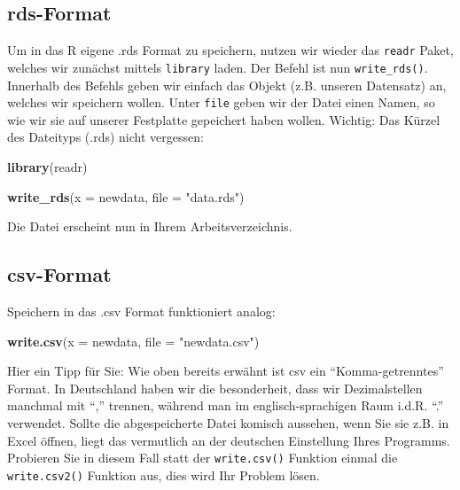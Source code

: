 \documentclass[
]{book}
\newenvironment{Shaded}{\begin{snugshade}}{\end{snugshade}}
\newcommand{\AttributeTok}[1]{\textcolor[rgb]{0.13,0.29,0.53}{#1}}
\newcommand{\FunctionTok}[1]{\textcolor[rgb]{0.13,0.29,0.53}{\textbf{#1}}}
\newcommand{\NormalTok}[1]{#1}
\newcommand{\StringTok}[1]{\textcolor[rgb]{0.31,0.60,0.02}{#1}}
\begin{document}
\subsection{rds-Format}\label{rds-format-1}

Um in das R eigene .rds Format zu speichern, nutzen wir wieder das \texttt{readr} Paket, welches wir zunächst mittels \texttt{library} laden. Der Befehl ist nun \texttt{write\_rds()}. Innerhalb des Befehls geben wir einfach das Objekt (z.B. unseren Datensatz) an, welches wir speichern wollen. Unter \texttt{file} geben wir der Datei einen Namen, so wie wir sie auf unserer Festplatte gepeichert haben wollen. Wichtig: Das Kürzel des Dateityps (.rds) nicht vergessen:

\begin{Shaded}
\begin{Highlighting}[]
\FunctionTok{library}\NormalTok{(readr)}

\FunctionTok{write\_rds}\NormalTok{(}\AttributeTok{x =}\NormalTok{ newdata, }\AttributeTok{file =} \StringTok{"data.rds"}\NormalTok{)}
\end{Highlighting}
\end{Shaded}

Die Datei erscheint nun in Ihrem Arbeitsverzeichnis.

\subsection{csv-Format}\label{csv-format-1}

Speichern in das .csv Format funktioniert analog:

\begin{Shaded}
\begin{Highlighting}[]
\FunctionTok{write.csv}\NormalTok{(}\AttributeTok{x =}\NormalTok{ newdata, }\AttributeTok{file =} \StringTok{"newdata.csv"}\NormalTok{)}
\end{Highlighting}
\end{Shaded}

Hier ein Tipp für Sie: Wie oben bereits erwähnt ist csv ein ``Komma-getrenntes'' Format. In Deutschland haben wir die besonderheit, dass wir Dezimalstellen manchmal mit ``,'' trennen, während man im englisch-sprachigen Raum i.d.R. ``.'' verwendet. Sollte die abgespeicherte Datei komisch aussehen, wenn Sie sie z.B. in Excel öffnen, liegt das vermutlich an der deutschen Einstellung Ihres Programms. Probieren Sie in diesem Fall statt der \texttt{write.csv()} Funktion einmal die \texttt{write.csv2()} Funktion aus, dies wird Ihr Problem lösen.
\end{document}
